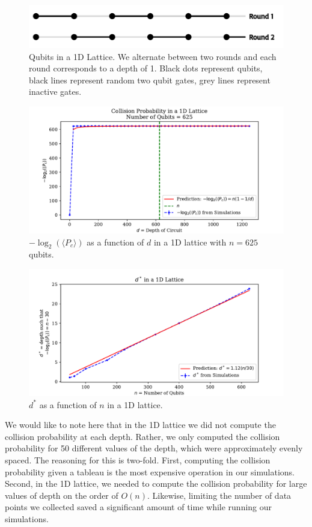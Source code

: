 \documentclass[11pt]{article}
\theoremstyle{definition}
\theoremstyle{plain}
\begin{document}
\begin{figure}[!htb]
\centering
\includegraphics[width=.8\textwidth]{figures/1D/1D_circuit.pdf}
\caption{Qubits in a 1D Lattice. We alternate between two rounds and each round corresponds to a depth of 1. Black dots represent qubits, black lines represent random two qubit gates, grey lines represent inactive gates. }
\label{fig_1d}
\end{figure}
\begin{figure}[!htb]
\centering
\includegraphics[width=.8\textwidth]{figures/1D/cp_mean_log.pdf}
\caption{$-\log_2(\langle P_c \rangle)$ as a function of $d$ in a 1D lattice with $n = 625$ qubits.}
\label{k_1d} 
\end{figure}
\begin{figure}[!htb]
\centering
\includegraphics[width=.8\textwidth]{figures/1D/x_star_30.pdf}
\caption{$d^*$ as a function of $n$ in a 1D lattice.}
\label{d_star_1d}
\end{figure}

We would like to note here that in the 1D lattice we did not compute the collision probability at each depth. Rather, we only computed the collision probability for 50 different values of the depth, which were approximately evenly spaced. The reasoning for this is two-fold. First, computing the collision probability given a tableau is the most expensive operation in our simulations. Second, in the 1D lattice, we needed to compute the collision probability for large values of depth on the order of $O(n)$. Likewise, limiting the number of data points we collected saved a significant amount of time while running our simulations.
\end{document}
